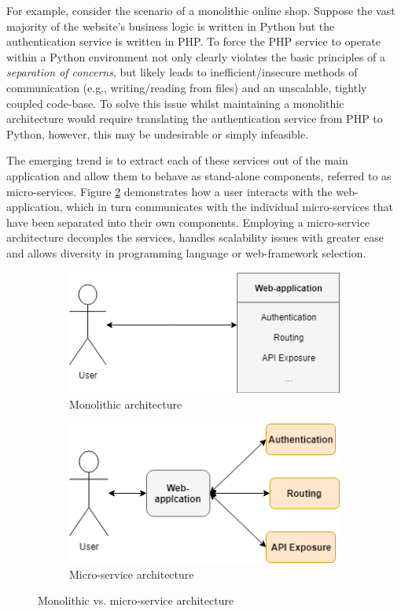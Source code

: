 \documentclass{l4proj}
\begin{document}
For example, consider the scenario of a monolithic online shop. Suppose the vast majority of the website's business logic is written in Python but the authentication service is written in PHP. To force the PHP service to operate within a Python environment not only clearly violates the basic principles of a \textit{separation of concerns}, but likely leads to inefficient/insecure methods of communication (e.g., writing/reading from files) and an unscalable, tightly coupled code-base. To solve this issue whilst maintaining a monolithic architecture would require translating the authentication service from PHP to Python, however, this may be undesirable or simply infeasible.

The emerging trend is to extract each of these services out of the main application and allow them to behave as stand-alone components, referred to as micro-services. Figure \ref{fig:micro} demonstrates how a user interacts with the web-application, which in turn communicates with the individual micro-services that have been separated into their own components. Employing a micro-service architecture decouples the services, handles scalability issues with greater ease and allows diversity in programming language or web-framework selection.

\begin{figure}[h]
	\centering
	\begin{subfigure}[b]{.5\textwidth}
		\centering
		\includegraphics[width=.6\linewidth]{images/mono.png}
		\caption{Monolithic architecture}
		\label{fig:mono}
	\end{subfigure}%
	\begin{subfigure}[b]{.5\textwidth}
		\centering
		\includegraphics[width=.6\linewidth]{images/micro.png}
		\caption{Micro-service architecture}
		\label{fig:micro}
	\end{subfigure}
	\caption{Monolithic vs. micro-service architecture}\label{fig:mono-micro}	
\end{figure}
\end{document}
